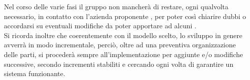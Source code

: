 Nel corso delle varie fasi il gruppo non mancherà di restare, ogni qualvolta necessario, in contatto con l'azienda proponente \proponente{}, per poter così chiarire dubbi o accordarsi su eventuali modifiche da poter apportare ad alcuni .\\
Si ricorda inoltre che coerentemente con il modello scelto, lo sviluppo in genere avverrà in modo incrementale, perciò, oltre ad una preventiva organizzazione delle parti, si procederà sempre all'implementazione per aggiunte e/o modifiche successive, secondo incrementi stabiliti e cercando ogni volta di garantire un sistema funzionante.
